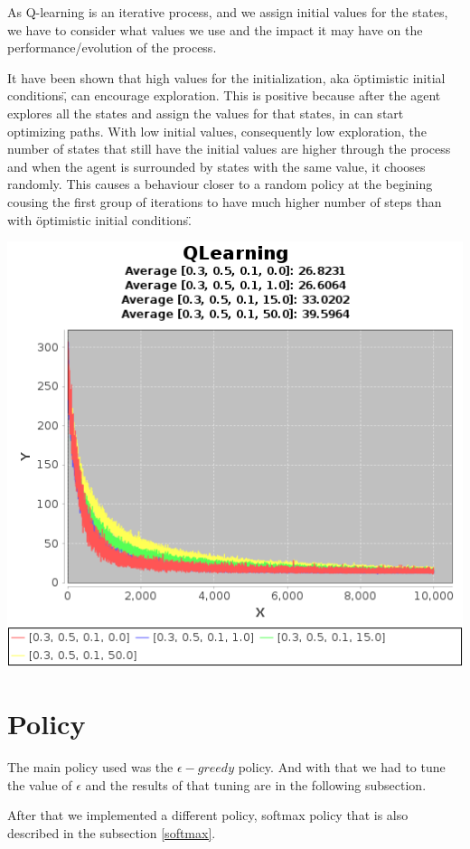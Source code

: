 \documentclass{article}
\begin{document}
As Q-learning is an iterative process, and we assign initial values for the
states, we have to consider what values we use and the impact it may have on the
performance/evolution of the process.

It have been shown that high values for the initialization, aka \"optimistic
initial conditions\", can encourage exploration. This is positive because after
the agent explores all the states and assign the values for that states, in can
start optimizing paths.
With low initial values, consequently low exploration, the number of states that
still have the initial values are higher through the process and when the agent
is surrounded by states with the same value, it chooses randomly. This causes a
behaviour closer to a random policy at the begining cousing the first group of
iterations to have much higher number of steps than with \"optimistic
initial conditions\".

\includegraphics[]{res/alpha_03_gama_05_epsilon_01IV_00_to_50.png}

\section{Policy}
The main policy used was the $\epsilon-greedy$ policy. And with that we had to
tune the value of $\epsilon$ and the results of that tuning are in the following
subsection.

After that we implemented a different policy, softmax policy that is also
described in the subsection \ref{softmax}.
\end{document}
